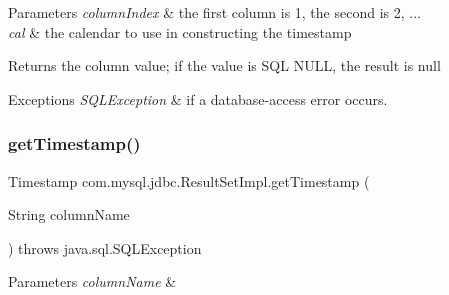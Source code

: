 \begin{DoxyParams}{Parameters}
{\em column\+Index} & the first column is 1, the second is 2, ... \\
\hline
{\em cal} & the calendar to use in constructing the timestamp\\
\hline
\end{DoxyParams}
\begin{DoxyReturn}{Returns}
the column value; if the value is S\+QL N\+U\+LL, the result is null
\end{DoxyReturn}

\begin{DoxyExceptions}{Exceptions}
{\em S\+Q\+L\+Exception} & if a database-\/access error occurs. \\
\hline
\end{DoxyExceptions}
\mbox{\label{classcom_1_1mysql_1_1jdbc_1_1_result_set_impl_ab59180f7dee8a2c4f89a30d6d9140e3e}} 
\subsubsection{\texorpdfstring{get\+Timestamp()}{getTimestamp()}\hspace{0.1cm}{\footnotesize\ttfamily [3/4]}}
{\footnotesize\ttfamily Timestamp com.\+mysql.\+jdbc.\+Result\+Set\+Impl.\+get\+Timestamp (\begin{DoxyParamCaption}\item[{String}]{column\+Name }\end{DoxyParamCaption}) throws java.\+sql.\+S\+Q\+L\+Exception}


\begin{DoxyParams}{Parameters}
{\em column\+Name} & \\
\hline
\end{DoxyParams}

